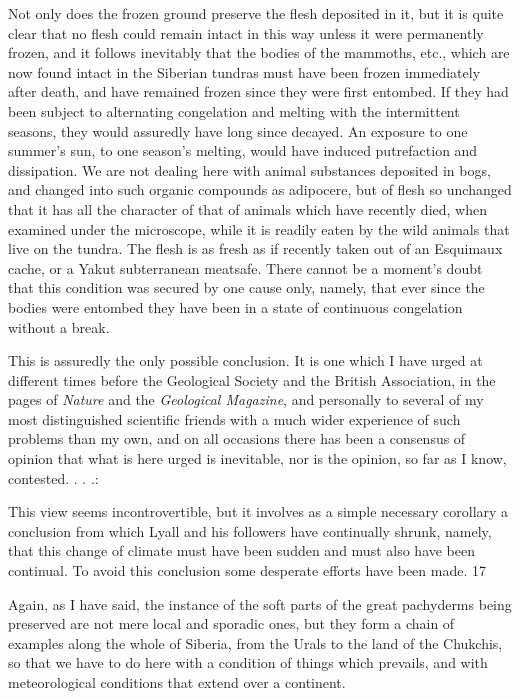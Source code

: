 Not only does the frozen ground preserve the flesh deposited in it, but it is quite clear that no
flesh could remain intact in this way unless it were permanently frozen, and it follows
inevitably that the bodies of the mammoths, etc., which are now found intact in the Siberian
tundras must have been frozen immediately after death, and have remained frozen since they
were first entombed. If they had been subject to alternating congelation and melting with the
intermittent seasons, they would assuredly have long since decayed. An exposure to one
summer's sun, to one season's melting, would have induced putrefaction and dissipation. We
are not dealing here with animal substances deposited in bogs, and changed into such organic
compounds as adipocere, but of flesh so unchanged that it has all the character of that of
animals which have recently died, when examined under the microscope, while it is readily
eaten by the wild animals that live on the tundra. The flesh is as fresh as if recently taken out
of an Esquimaux cache, or a Yakut subterranean meatsafe. There cannot be a moment's doubt
that this condition was secured by one cause only, namely, that ever since the bodies were
entombed they have been in a state of continuous congelation without a break.

This is assuredly the only possible conclusion. It is one which I have urged at different times
before the Geological Society and the British Association, in the pages of \textit{Nature} and the
\textit{Geological Magazine}, and personally to several of my most distinguished scientific friends
with a much wider experience of such problems than my own, and on all occasions there has
been a consensus of opinion that what is here urged is inevitable, nor is the opinion, so far as
I know, contested. . . .:

This view seems incontrovertible, but it involves as a simple necessary corollary a conclusion
from which Lyall and his followers have continually shrunk, namely, that this change of
climate must have been sudden and must also have been continual. To avoid this conclusion
some desperate efforts have been made. 17

Again, as I have said, the instance of the soft parts of the great pachyderms being preserved
are not mere local and sporadic ones, but they form a chain of examples along the whole of
Siberia, from the Urals to the land of the Chukchis, so that we have to do here with a
condition of things which prevails, and with meteorological conditions that extend over a
continent.

